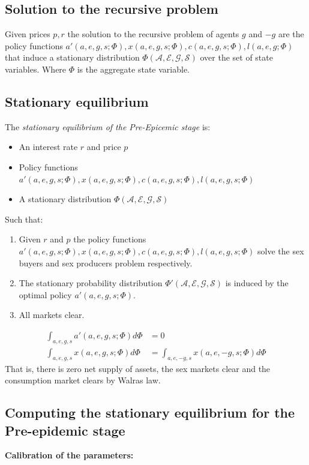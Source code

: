  \subsection*{Solution to the recursive problem}
 Given prices $p,r$ the solution to the recursive problem of agents $g$ and $-g$  are the policy functions $a'(a,e,g,s;\Phi), x(a,e,g,s;\Phi), c(a,e,g,s;\Phi), l(a,e,g;\Phi)$ that induce a stationary distribution $\Phi(\mathcal{A,E,G,S})$ over the set of state variables. Where $\Phi$ is the aggregate state variable.
 \subsection*{Stationary equilibrium}
 The \textit{stationary equilibrium of the Pre-Epicemic stage} is:
 \begin{itemize}
 \item An interest rate $r$ and price $p$
 \item Policy functions $a'(a,e,g,s;\Phi), x(a,e,g,s;\Phi), c(a,e,g,s;\Phi), l(a,e,g,s;\Phi)$
 \item A stationary distribution $\Phi(\mathcal{A,E,G,S}) $
 \end{itemize}
 Such that:
 \begin{enumerate}[label=\alph*]
 \item Given $r$ and $p$ the policy functions  $a'(a,e,g,s;\Phi), x(a,e,g,s;\Phi), c(a,e,g,s;\Phi), l(a,e,g,s;\Phi)$ solve the sex buyers and sex producers problem respectively. 
 \item The stationary probability distribution $\Phi'(\mathcal{A,E,G,S})$ is induced by the optimal policy $a'(a,e,g,s;\Phi)$.
 \item All markets clear. 
  \end{enumerate}
 \begin{align*}
\int_{a,e,g,s} a'(a,e,g,s;\Phi) d\Phi &= 0 \\
\int_{a,e,g,s} x(a,e,g,s;\Phi) d \Phi &= \int_{a,e,-g,s} x(a,e,-g,s;\Phi) d\Phi
\end{align*} 
That is, there is zero net supply of assets, the sex markets clear and the consumption market clears by Walras law. 
\subsection*{Computing the stationary equilibrium for the Pre-epidemic stage}
\noindent \textbf{Calibration of the parameters:}\\


